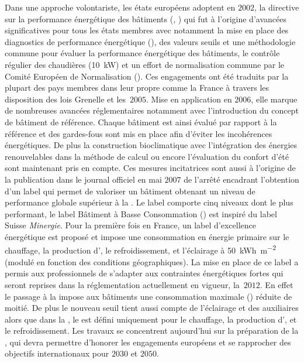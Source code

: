 Dans une approche volontariste, les états européens adoptent en $2002$, la directive sur la
performance énergétique des bâtiments (, \cite{EPBD2002}) qui fut à
l’origine d’avancées significatives pour tous les états membres avec notamment la mise en
place des diagnostics de performance énergétique (), des valeurs seuils et une
méthodologie commune pour évaluer la performance énergétique des bâtiments, le contrôle
régulier des chaudières (\SI{+10}{kW}) et un effort de normalisation commune par le Comité
Européen de Normalisation ().
Ces engagements ont été traduits par la plupart des pays membres dans leur 
propre comme la France à travers les
disposition des lois Grenelle et les \,$2005$.
Mise en application en $2006$, elle marque de nombreuses avancées
réglementaires notamment avec l’introduction du concept de bâtiment de référence. Chaque
bâtiment est ainsi évalué par rapport à la référence et des gardes-fous sont mis en place
afin d’éviter les incohérences énergétiques. De plus la construction bioclimatique avec
l’intégration des énergies renouvelables dans la méthode de calcul ou encore l’évaluation
du confort d’été sont maintenant pris en compte.
Ces mesures incitatrices sont aussi à l’origine de la publication dans le journal officiel
en mai $2007$ de l’arrêté encadrant l’obtention d’un label  qui permet de valoriser
un bâtiment obtenant un niveau de performance globale supérieur à la .
Le label comporte cinq niveaux dont le plus performant, le label Bâtiment à
Basse Consommation ()
est inspiré du label Suisse \textit{Minergie}. Pour la première fois en France, un
label d’excellence énergétique est proposé et impose une consommation en énergie primaire
sur le chauffage, la production d’, le refroidissement, et l’éclairage à
\SI{50}{kWh\per\metre\squared} (modulé en fonction des conditions géographiques).
La mise en place de ce label a permis aux professionnels de s’adapter aux contraintes
énergétiques fortes qui seront reprises dans la réglementation actuellement en vigueur, la
\,$2012$.
En effet le passage à la  impose aux bâtiments une consommation maximale ()
réduite de moitié. De plus le nouveau seuil tient aussi compte de l’éclairage et des auxiliaires alors
que dans la , le  est défini uniquement pour le
chauffage, la production d’, et le refroidissement. Les travaux se concentrent
aujourd’hui sur la préparation de la , qui devra permettre d’honorer les
engagements européens et se rapprocher des objectifs internationaux pour $2030$ et $2050$.

